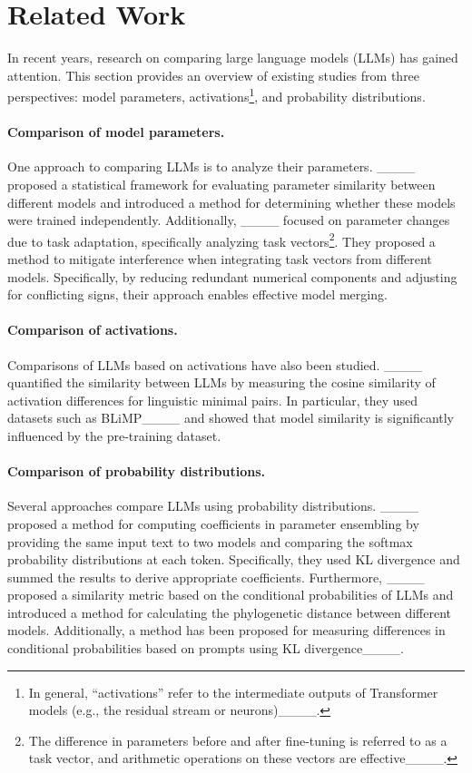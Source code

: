 \section{Related Work}
\label{sec:related-work}
In recent years, research on comparing large language models (LLMs) has gained attention.  
This section provides an overview of existing studies from three perspectives: model parameters, activations\footnote{In general, ``activations'' refer to the intermediate outputs of Transformer models (e.g., the residual stream or neurons)____.}, and probability distributions.

\paragraph{Comparison of model parameters.}
One approach to comparing LLMs is to analyze their parameters.
____ proposed a statistical framework for evaluating parameter similarity between different models and introduced a method for determining whether these models were trained independently. 
Additionally, ____ focused on parameter changes due to task adaptation, specifically analyzing task vectors\footnote{The difference in parameters before and after fine-tuning is referred to as a task vector, and arithmetic operations on these vectors are effective____.}. They proposed a method to mitigate interference when integrating task vectors from different models. Specifically, by reducing redundant numerical components and adjusting for conflicting signs, their approach enables effective model merging.

\paragraph{Comparison of activations.}
Comparisons of LLMs based on activations have also been studied.  
____ quantified the similarity between LLMs by measuring the cosine similarity of activation differences for linguistic minimal pairs.
In particular, they used datasets such as BLiMP____ and showed that model similarity is significantly influenced by the pre-training dataset.

\paragraph{Comparison of probability distributions.}
Several approaches compare LLMs using probability distributions.
____ proposed a method for computing coefficients in parameter ensembling by providing the same input text to two models and comparing the softmax probability distributions at each token. 
Specifically, they used KL divergence and summed the results to derive appropriate coefficients.
Furthermore, ____ proposed a similarity metric based on the conditional probabilities of LLMs and introduced a method for calculating the phylogenetic distance between different models. 
 Additionally, a method has been proposed for measuring differences in conditional probabilities based on prompts using KL divergence____.
